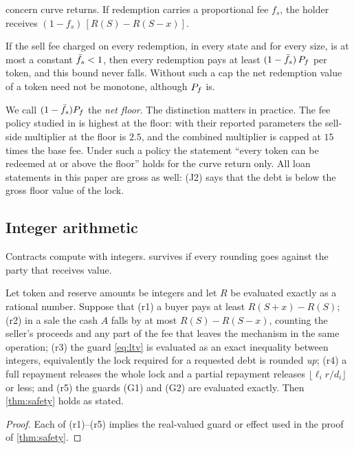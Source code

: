  concern curve returns. If redemption carries a proportional fee $f_s$, the holder receives $(1-f_s)\,[R(S)-R(S-x)]$.

\begin{proposition}\label{prop:net}
If the sell fee charged on every redemption, in every state and for every size, is at most a constant $\bar f_s<1$, then every redemption pays at least $(1-\bar f_s)\,P_f$ per token, and this bound never falls. Without such a cap the net redemption value of a token need not be monotone, although $P_f$ is.
\end{proposition}

We call $(1-\bar f_s)P_f$ the \emph{net floor}. The distinction matters in practice. The fee policy studied in \vone{} is highest at the floor: with their reported parameters the sell-side multiplier at the floor is $2.5$, and the combined multiplier is capped at $15$ times the base fee. Under such a policy the statement ``every token can be redeemed at or above the floor'' holds for the curve return only. All loan statements in this paper are gross as well: (J2) says that the debt is below the gross floor value of the lock.

\subsection{Integer arithmetic}\label{sec:integer}

Contracts compute with integers.  survives if every rounding goes against the party that receives value.

\begin{proposition}\label{prop:int}
Let token and reserve amounts be integers and let $R$ be evaluated exactly as a rational number. Suppose that (r1) a buyer pays at least $R(S+x)-R(S)$; (r2) in a sale the cash $A$ falls by at most $R(S)-R(S-x)$, counting the seller's proceeds and any part of the fee that leaves the mechanism in the same operation; (r3) the guard \eqref{eq:ltv} is evaluated as an exact inequality between integers, equivalently the lock required for a requested debt is rounded \emph{up}; (r4) a full repayment releases the whole lock and a partial repayment releases $\lfloor\ell_i r/d_i\rfloor$ or less; and (r5) the guards (G1) and (G2) are evaluated exactly. Then \cref{thm:safety} holds as stated.
\end{proposition}
\begin{proof}
Each of (r1)--(r5) implies the real-valued guard or effect used in the proof of \cref{thm:safety}.
\end{proof}

